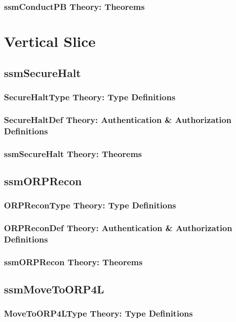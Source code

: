 \documentclass[hidelinks,12pt,a4paper]{report}
\begin{document}
\begin{appendices}
\subsubsection{ssmConductPB Theory: Theorems}


\section{Vertical Slice}
\subsection{ssmSecureHalt}
\subsubsection{SecureHaltType Theory: Type Definitions}
\subsubsection{SecureHaltDef Theory: Authentication \& Authorization Definitions}
\subsubsection{ssmSecureHalt Theory: Theorems}

\subsection{ssmORPRecon}
\subsubsection{ORPReconType Theory: Type Definitions}
\subsubsection{ORPReconDef Theory: Authentication \& Authorization Definitions}
\subsubsection{ssmORPRecon Theory: Theorems}

\subsection{ssmMoveToORP4L}
\subsubsection{MoveToORP4LType Theory: Type Definitions}

\end{appendices}
\end{document}
